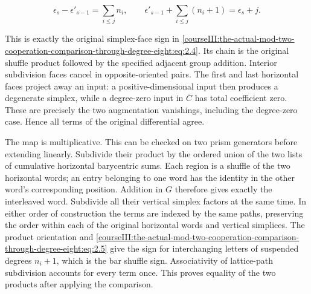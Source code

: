 \begin{equation}
\epsilon_s-\epsilon'_{s-1}=\sum_{i\leq j}n_i,
\qquad
\epsilon'_{s-1}+\sum_{i\leq j}(n_i+1)=\epsilon_s+j.
\label{courseIII:the-actual-mod-two-cooperation-comparison-through-degree-eight:eq:2.7}
\end{equation}

This is exactly the original simplex-face sign in \eqref{courseIII:the-actual-mod-two-cooperation-comparison-through-degree-eight:eq:2.4}. Its chain is the original shuffle product followed by the specified adjacent group addition. Interior subdivision faces cancel in opposite-oriented pairs. The first and last horizontal faces project away an input: a positive-dimensional input then produces a degenerate simplex, while a degree-zero input in \(\bar C\) has total coefficient zero. These are precisely the two augmentation vanishings, including the degree-zero case. Hence all terms of the original differential agree.

The map is multiplicative. This can be checked on two prism generators before extending linearly. Subdivide their product by the ordered union of the two lists of cumulative horizontal barycentric sums. Each region is a shuffle of the two horizontal words; an entry belonging to one word has the identity in the other word's corresponding position. Addition in \(G\) therefore gives exactly the interleaved word. Subdivide all their vertical simplex factors at the same time. In either order of construction the terms are indexed by the same paths, preserving the order within each of the original horizontal words and vertical simplices. The product orientation and \eqref{courseIII:the-actual-mod-two-cooperation-comparison-through-degree-eight:eq:2.5} give the sign for interchanging letters of suspended degrees \(n_i+1\), which is the bar shuffle sign. Associativity of lattice-path subdivision accounts for every term once. This proves equality of the two products after applying the comparison.

